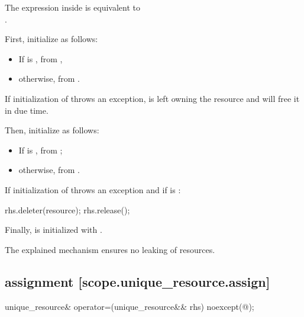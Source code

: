 \documentclass[ebook,11pt,article]{memoir}
\begin{document}
\begin{itemdescr}
\pnum
\remarks
The expression inside  is equivalent to \\
 \tcode{\&\&} .

\pnum
\effects First, initialize  as follows: 
\begin{itemize}
\item If  is , from , 
\item otherwise, from .  
\end{itemize}

\pnum
\begin{note}
If initialization of  throws an exception,  is left owning the resource and will free it in due time.
\end{note}

\pnum
Then, initialize  as follows: 
\begin{itemize}
\item If  is , 
from ;
\item otherwise, 
from . 
\end{itemize}

\pnum
If initialization of  throws an exception and 
if  is :
\begin{codeblock}
    rhs.deleter(resource); rhs.release();
\end{codeblock}

\pnum
Finally,  is initialized with .

\pnum
\begin{note}
The explained mechanism ensures no leaking of resources.
\end{note}
\end{itemdescr}

\subsection { assignment [scope.unique_resource.assign]}

\begin{itemdecl}
unique_resource& operator=(unique_resource&& rhs) noexcept(@\seebelow@);
\end{itemdecl}
\end{document}

